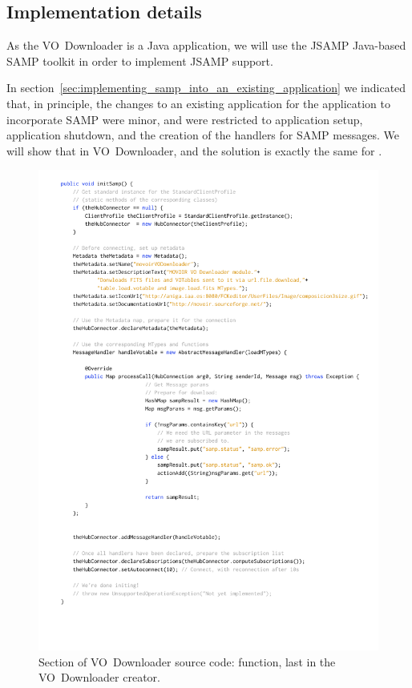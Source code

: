 		\subsection{Implementation details} %
		\label{sub:implementation_details_vodownloader}
			
			\newcommand{\initSamp}
			{\method{initSamp()}}
			\newcommand{\shutdownSamp}
			{\method{shutdownSamp()}}
			
			As the VO~Downloader is a Java application, we will
			use the JSAMP\urlnote{\jsampurl} Java-based SAMP
			toolkit in order to implement JSAMP support.
			
			In
	section~\ref{sec:implementing_samp_into_an_existing_application}
			we indicated that, in principle, the changes to an
			existing application for the application to incorporate
			SAMP were minor, and were restricted to application
			setup, application shutdown, and the creation of the
			handlers for SAMP messages. We will show that in
			VO~Downloader, and the solution is exactly the same for
			\massa{}.
			
			\begin{figure}[tbp]
				\centering
					\includegraphics[width=\textwidth]
					{fig/VODownloader_initSamp.pdf}
				\caption[VO Downloader: \texttt{initSamp()}]
				{
					Section of VO~Downloader source code:
					\initSamp{} function, last in the
					VO~Downloader creator.
				}
				\label{fig:fig_VODownloader_initSamp}
			\end{figure}
			
